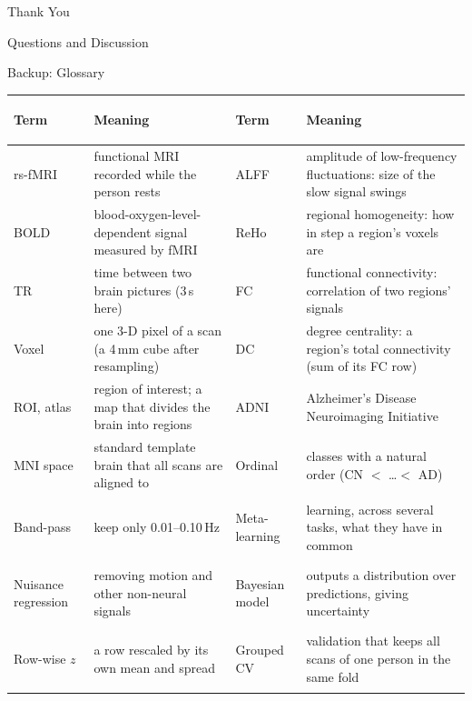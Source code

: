 \documentclass[aspectratio=169,11pt]{beamer}
\begin{document}
\begin{frame}[plain]
  \centering
  \vfill
  {\color{UniversityBlue}\Huge Thank You}\par
  \vspace{0.5cm}
  {\Large Questions and Discussion}\par
  \vspace{0.8cm}
  \vfill
\end{frame}

\appendix

\begin{frame}{Backup: Glossary}
  \scriptsize
  \begin{tabularx}{\textwidth}{>{\bfseries\raggedright\arraybackslash}p{1.9cm}>{\raggedright\arraybackslash}X>{\bfseries\raggedright\arraybackslash}p{1.9cm}>{\raggedright\arraybackslash}X}
    \toprule
    Term & Meaning & Term & Meaning \\
    \midrule
    rs-fMRI & functional MRI recorded while the person rests & ALFF & amplitude of low-frequency fluctuations: size of the slow signal swings \\[2pt]
    BOLD & blood-oxygen-level-dependent signal measured by fMRI & ReHo & regional homogeneity: how in step a region's voxels are \\[2pt]
    TR & time between two brain pictures (3\,s here) & FC & functional connectivity: correlation of two regions' signals \\[2pt]
    Voxel & one 3-D pixel of a scan (a 4\,mm cube after resampling) & DC & degree centrality: a region's total connectivity (sum of its FC row) \\[2pt]
    ROI, atlas & region of interest; a map that divides the brain into regions & ADNI & Alzheimer's Disease Neuroimaging Initiative \\[2pt]
    MNI space & standard template brain that all scans are aligned to & Ordinal & classes with a natural order (CN $<$ \dots $<$ AD) \\[2pt]
    Band-pass & keep only 0.01--0.10\,Hz & Meta-learning & learning, across several tasks, what they have in common \\[2pt]
    Nuisance regression & removing motion and other non-neural signals & Bayesian model & outputs a distribution over predictions, giving uncertainty \\[2pt]
    Row-wise $z$ & a row rescaled by its own mean and spread & Grouped CV & validation that keeps all scans of one person in the same fold \\
    \bottomrule
  \end{tabularx}
\end{frame}
\end{document}
